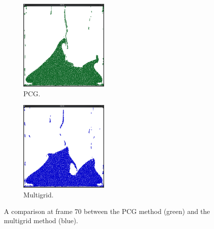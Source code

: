 \begin{figure}[ht!]
\centering
\begin{subfigure}[]{0.3\textwidth}
\includegraphics[height=45mm]{png/pcg5.png}
\caption{PCG.}
\end{subfigure}
\begin{subfigure}[]{0.3\textwidth}
\includegraphics[height=45mm]{png/multigrid5.png}
\caption{Multigrid.}
\end{subfigure}
\caption{A comparison at frame 70 between the PCG method (green) and the multigrid method (blue).}
\label{pcgvsmulti}
\end{figure}
